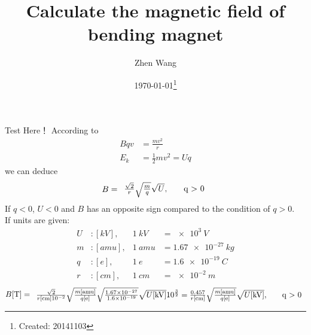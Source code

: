 \documentclass[letterpaper,11pt,pdftex]{article}
\title{Calculate the magnetic field of bending magnet }
\author{Zhen Wang}
\date{\today\footnote{Created: 20141103}}
\begin{document}
\maketitle
Test Here！
According to 
\begin{align}
    \label{eq:1}
    Bqv &= \frac{m{v}^{2}}{r} \\ 
    {E}_{k} &= \frac{1}{2}m{v}^{2 }= Uq             
\end{align}
we can deduce
\begin{align}
    B = \begin{array}{l l}
            \frac{\sqrt{2}}{r}\sqrt{\frac{m}{q}}\sqrt{U}, & \quad $q > 0$  
        \end{array}
\end{align}
If $q < 0$, $U < 0$ and $B$ has an opposite sign compared to the condition of $q > 0$. \\        
If units are given:
\begin{align}
    U &: [\si{kV}],  & \SI{1}{kV}  &= \SI{e3}{V} \\ 
    m &: [\si{amu}], & \SI{1}{amu} &= \SI{1.67e-27}{kg} \\ 
    q &: [\si{e}],   & \SI{1}{e}   &= \SI{1.6e-19}{C} \\ 
    r &: [\si{cm}],  & \SI{1}{cm}  &= \SI{e-2}{m}
\end{align}
\begin{align}
    B[\si{T}] = \begin{array}{l l}
                    \frac{\sqrt{2}}{r[\si{cm}]\SI{e-2}{}}\sqrt{\frac{m[\si{amu}]}{q[\si{e}]}}\sqrt{\frac{\SI{1.67e-27}{}}{\SI{1.6e-19}{}}}\sqrt{U[\si{kV}]}10^{\frac{3}{2}}  =  \frac{0.457}{r[\si{cm}]}\sqrt{\frac{m[\si{amu}]}{q[\si{e}]}}\sqrt{U[\si{kV}]},  & \quad $q > 0$ 
                \end{array}
\end{align}
\end{document}
